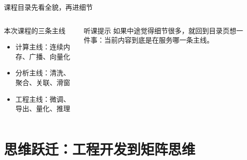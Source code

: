 \documentclass[aspectratio=169,9pt]{beamer}
\begin{document}
\begin{frame}{课程目录}{先看全貌，再进细节}
\begin{columns}[T]
    \tableofcontents[hideallsubsections]

    \begin{block}{本次课程的三条主线}
    \begin{itemize}
        \item 计算主线：连续内存、广播、向量化
        \item 分析主线：清洗、聚合、关联、滑窗
        \item 工程主线：微调、导出、量化、推理
    \end{itemize}
    \end{block}

    \begin{alertblock}{听课提示}
        \scriptsize 如果中途觉得细节很多，就回到目录页想一件事：当前内容到底是在服务哪一条主线。
    \end{alertblock}
\end{columns}
\end{frame}

\section{思维跃迁：工程开发到矩阵思维}
\end{document}
